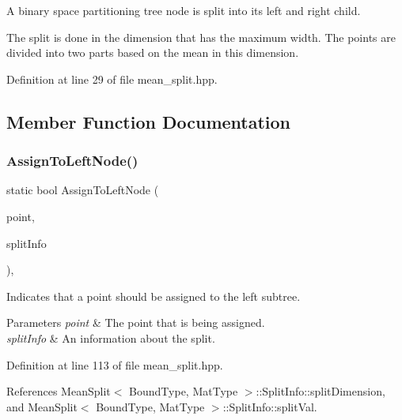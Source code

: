 A binary space partitioning tree node is split into its left and right child. 

The split is done in the dimension that has the maximum width. The points are divided into two parts based on the mean in this dimension. 

Definition at line 29 of file mean\+\_\+split.\+hpp.



\subsection{Member Function Documentation}
\mbox{\label{classmlpack_1_1tree_1_1MeanSplit_af0fc61f469596cb8796d1966564ecbcb}} 
\subsubsection{Assign\+To\+Left\+Node()}
{\footnotesize\ttfamily static bool Assign\+To\+Left\+Node (\begin{DoxyParamCaption}\item[{const Vec\+Type \&}]{point,  }\item[{const \textbf{ Split\+Info} \&}]{split\+Info }\end{DoxyParamCaption})\hspace{0.3cm}{\ttfamily [inline]}, {\ttfamily [static]}}



Indicates that a point should be assigned to the left subtree. 


\begin{DoxyParams}{Parameters}
{\em point} & The point that is being assigned. \\
\hline
{\em split\+Info} & An information about the split. \\
\hline
\end{DoxyParams}


Definition at line 113 of file mean\+\_\+split.\+hpp.



References Mean\+Split$<$ Bound\+Type, Mat\+Type $>$\+::\+Split\+Info\+::split\+Dimension, and Mean\+Split$<$ Bound\+Type, Mat\+Type $>$\+::\+Split\+Info\+::split\+Val.

\mbox{\label{classmlpack_1_1tree_1_1MeanSplit_aace8240352cb3ea61c975987b91a80a6}} 
